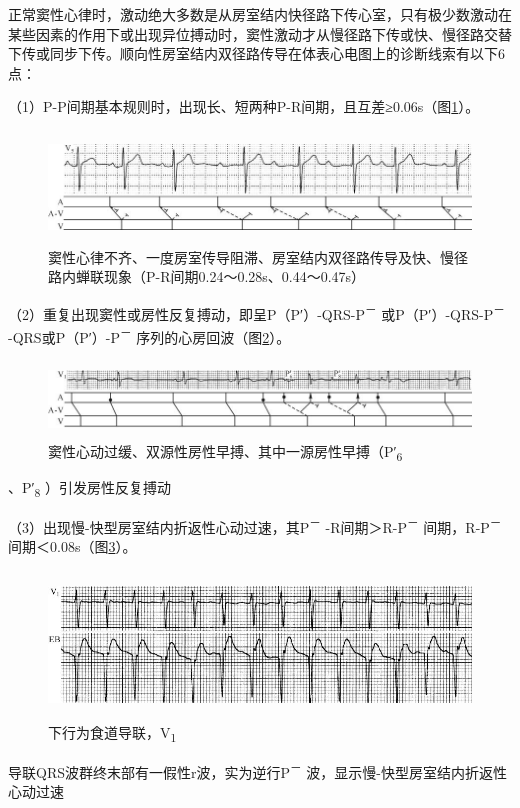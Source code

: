 正常窦性心律时，激动绝大多数是从房室结内快径路下传心室，只有极少数激动在某些因素的作用下或出现异位搏动时，窦性激动才从慢径路下传或快、慢径路交替下传或同步下传。顺向性房室结内双径路传导在体表心电图上的诊断线索有以下6点：

（1）P-P间期基本规则时，出现长、短两种P-R间期，且互差≥0.06s（图\ref{fig25-3}）。

\begin{figure}[!htbp]
 \centering
 \includegraphics[width=5.82292in,height=1.16667in]{./images/Image00414.jpg}
 \captionsetup{justification=centering}
 \caption{窦性心律不齐、一度房室传导阻滞、房室结内双径路传导及快、慢径路内蝉联现象（P-R间期0.24～0.28s、0.44～0.47s）}
 \label{fig25-3}
  \end{figure} 

（2）重复出现窦性或房性反复搏动，即呈P（P′）-QRS-P\textsuperscript{－}
或P（P′）-QRS-P\textsuperscript{－} -QRS或P（P′）-P\textsuperscript{－}
序列的心房回波（图\ref{fig25-4}）。

\begin{figure}[!htbp]
 \centering
 \includegraphics[width=5.82292in,height=0.79167in]{./images/Image00415.jpg}
 \captionsetup{justification=centering}
 \caption{窦性心动过缓、双源性房性早搏、其中一源房性早搏（P′\textsubscript{6}}
 \label{fig25-4}
  \end{figure} 
、P′\textsubscript{8} ）引发房性反复搏动

（3）出现慢-快型房室结内折返性心动过速，其P\textsuperscript{－}
-R间期＞R-P\textsuperscript{－} 间期，R-P\textsuperscript{－}
间期＜0.08s（图\ref{fig25-5}）。

\begin{figure}[!htbp]
 \centering
 \includegraphics[width=5.5625in,height=1.53125in]{./images/Image00416.jpg}
 \captionsetup{justification=centering}
 \caption{下行为食道导联，V\textsubscript{1}}
 \label{fig25-5}
  \end{figure} 
导联QRS波群终末部有一假性r波，实为逆行P\textsuperscript{－}
波，显示慢-快型房室结内折返性心动过速

